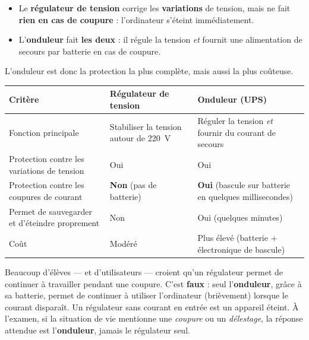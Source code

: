 \documentclass[11pt]{article}
\begin{document}
\begin{aretenir}
\begin{itemize}
\item Le \textbf{régulateur de tension} corrige les \textbf{variations} de tension, mais ne fait \textbf{rien en cas de coupure} : l'ordinateur s'éteint immédiatement.
\item L'\textbf{onduleur} fait \textbf{les deux} : il régule la tension \emph{et} fournit une alimentation de secours par batterie en cas de coupure.
\end{itemize}
L'onduleur est donc la protection la plus complète, mais aussi la plus coûteuse.
\end{aretenir}

\begin{center}
\begin{tabularx}{\linewidth}{|l|X|X|}
\hline
\rowcolor{popblueL} \textbf{Critère} & \textbf{Régulateur de tension} & \textbf{Onduleur (UPS)} \\
\hline
Fonction principale & Stabiliser la tension autour de \SI{220}{V} & Réguler la tension \emph{et} fournir du courant de secours \\
\hline
Protection contre les variations de tension & Oui & Oui \\
\hline
Protection contre les coupures de courant & \textbf{Non} (pas de batterie) & \textbf{Oui} (bascule sur batterie en quelques millisecondes) \\
\hline
Permet de sauvegarder et d'éteindre proprement & Non & Oui (quelques minutes) \\
\hline
Coût & Modéré & Plus élevé (batterie + électronique de bascule) \\
\hline
\end{tabularx}
\end{center}

\begin{attention}
Beaucoup d'élèves — et d'utilisateurs — croient qu'un régulateur permet de continuer à travailler pendant une coupure. C'est \textbf{faux} : seul l'\textbf{onduleur}, grâce à sa batterie, permet de continuer à utiliser l'ordinateur (brièvement) lorsque le courant disparaît. Un régulateur sans courant en entrée est un appareil éteint. À l'examen, si la situation de vie mentionne une \emph{coupure} ou un \emph{délestage}, la réponse attendue est l'\textbf{onduleur}, jamais le régulateur seul.
\end{attention}
\end{document}
